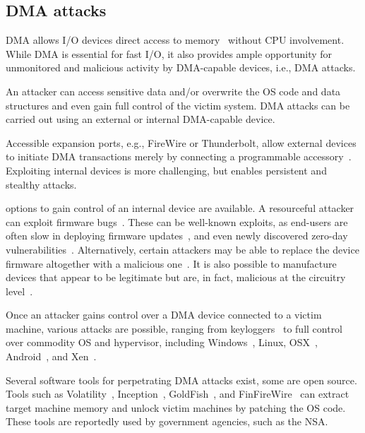 \subsection{DMA attacks}

DMA allows I/O devices direct access to memory~\cite{oC54} without CPU involvement. While DMA is essential for fast I/O, it also provides ample opportunity for unmonitored and malicious activity by DMA-capable devices, i.e., DMA attacks. 

An attacker can access sensitive data and/or overwrite the OS code and data structures and even gain full control of the victim system. DMA attacks can be carried out using an external or internal DMA-capable device. 

Accessible expansion ports, e.g., FireWire or Thunderbolt, allow external devices to initiate DMA transactions merely by connecting a programmable accessory~\cite{Dor04, Vol, MM, thunder}. 
Exploiting internal devices is more challenging, but enables persistent and stealthy attacks. 
\DIFdelbegin {}\DIFdelend 

\DIFdelbegin {}\DIFdelend \DIFaddbegin {}\DIFaddend options to gain control of an internal device are available.
A resourceful attacker can exploit firmware bugs~\cite{SB12}. These can be well-known exploits, as end-users are often slow in deploying firmware updates~\cite{DPVL10}, and even newly discovered zero-day vulnerabilities~\cite{Ben17b}. Alternatively, certain attackers may be able to replace the device firmware altogether with a malicious one~\cite{ZKB13, NL14}. It is also possible to manufacture devices that appear to be legitimate but are, in fact, malicious at the circuitry level~\cite{YHD16}.

Once an attacker gains control over a DMA device connected to a victim machine, various attacks are possible, ranging from keyloggers~\cite{LKV13, SB12} to full control over commodity OS and hypervisor, including Windows~\cite{AD10,thunder}, Linux, OSX~\cite{Fri16, thunder}, Android~\cite{Ben17b}, and Xen~\cite{Woj08}.

Several software tools for perpetrating DMA attacks exist, some are open source. Tools such as Volatility~\cite{Vol}, Inception~\cite{MM}, GoldFish~\cite{GA10}, and FinFireWire~\cite{Fin14} can extract target machine memory and unlock victim machines by patching the OS code. These tools are reportedly used by government agencies, such as the NSA.

